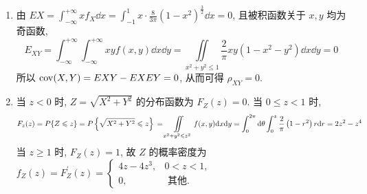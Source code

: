 \begin{solution}
\begin{enumerate}[label=(\arabic{*})]
        \item 由 $\displaystyle EX=\int_{-\infty}^{+\infty} x f_{X} \dd x=\int_{-1}^{1} x \cdot \frac{8}{3 \pi}\left(1-x^{2}\right)^{\frac{3}{2}} \dd x=0$, 且被积函数关于 $ x, y $ 均为奇函数, $$\displaystyle E_{X Y}  =\int_{-\infty}^{+\infty} \int_{-\infty}^{+\infty} x y f(x, y) \dd x \dd y
                  =\iint\limits_{x^{2}+y^{2} \leqslant 1}\frac{2}{\pi} x y\left(1-x^{2}-y^{2}\right) \dd x \dd y=0$$
              所以 $ \mathrm{cov}(X, Y)=E X Y-E X E Y=0 $, 从而可得 $ \rho_{X Y}=0 $.
        \item 当 $ z<0 $ 时, $ Z=\sqrt{X^{2}+Y^{2}} $ 的分布函数为 $ F_{Z}(z)=0 $.
              当 $ 0 \leqslant z<1 $ 时,
              $$
                  F_{z}(z) =P\{Z \leqslant z\}=P\left\{\sqrt{X^{2}+Y^{2}} \leqslant z\right\} \\
                  =\iint\limits_{x^{2}+y^{2} \leqslant z^{2}} f(x, y) \dd x \dd y \\
                  =\int_{0}^{2 \pi} \dd \theta \int_{0}^{z} \frac{2}{\pi}\left(1-r^{2}\right) r \dd r=2 z^{2}-z^{4}
              $$
              当 $ z \geqslant 1 $ 时, $F_{Z}(z)=1 $, 故 $ Z $ 的概率密度为
              $f_{Z}(z)=F_{Z}^{\prime}(z)=\begin{cases}
                      4 z-4 z^{3}, & 0<z<1,          \\
                      0,           & \text { 其他. }
                  \end{cases}$
    \end{enumerate}
\end{solution}

